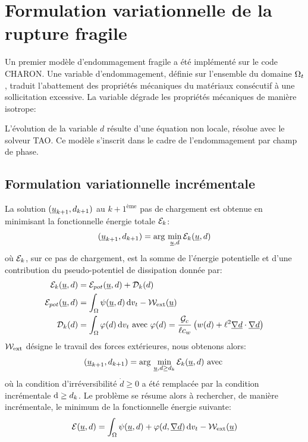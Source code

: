 \documentclass[10pt]{book}
\newcommand{\Gc}{\Gg_{c}}
\begin{document}
\section{Formulation variationnelle de la rupture fragile}\label{Section:Ajout de l'endommagement fragile}
Un premier modèle d'endommagement fragile a été implémenté sur le code CHARON. Une variable d'endommagement, définie sur l'ensemble du domaine $\Omega_{t}$, traduit l'abattement des propriétés mécaniques du matériaux consécutif à une sollicitation excessive. La variable dégrade les propriétés mécaniques de manière isotrope:

L'évolution de la variable $d$ résulte d'une équation non locale, résolue avec le solveur TAO. Ce modèle s'inscrit dans le cadre de l'endommagement par champ de phase.
\subsection{Formulation variationnelle incrémentale}
La solution $(\underline{u}_{k+1},d_{k+1})$ au $k+1^{\text{ème}}$ pas de chargement est obtenue en minimisant la fonctionnelle énergie totale $\mathcal{E}_{k}$:
\begin{equation}
(\underline{u}_{k+1},d_{k+1}) = \mathrm{arg}\,\min_{\underline{u},d} \mathcal{E}_{k}(\underline{u},d)
\label{eq:Minimisation_intra}
\end{equation}
où $\mathcal{E}_{k}$, sur ce pas de chargement, est la somme de l'énergie potentielle et d'une contribution du pseudo-potentiel de dissipation donnée par:
\begin{align}
\Etot_{k}(\Dep,d) &= \EPot(\Dep,d)+\mathcal{D}_{k}(d)\\
\EPot(\Dep,d) &=\int_{\Omega} \eHelm(\Dep,d)\dvt-\Wext(\Dep)\\
\mathcal{D}_{k}(d) &= \int_{\Omega}\varphi(d)\dvt
\avec \varphi(d)=\dfrac{\Gc}{\ell c_{w}}\left(w(d)+\ell^{2}\vec{\nabla d}\cdot\vec{\nabla d}\right)
\end{align}
$\mathcal{W}_\mathrm{ext}$ désigne le travail des forces extérieures, nous obtenons alors:
\begin{equation}
(\underline{u}_{k+1},d_{k+1})= \mathrm{arg}\,\min_{\underline{u},d \geq d_{k}} \mathcal{E}_{k}(\underline{u},d) \text{ avec } 
\label{eq:incremental-energy-minimization}
\end{equation}
où la condition d'irréversibilité $\dot{d}\geq 0$ a été remplacée par la condition incrémentale $\mathrm{d} \geq d_{k}$. Le problème se résume alors à rechercher, de manière incrémentale, le minimum de la fonctionnelle énergie suivante:
\begin{equation}
\mathcal{E}(\underline{u},d)=\int_{\Omega}\psi(\underline{u},d)+\varphi(d,\underline{\nabla d}) \,\mathrm{d}v_{t} -\mathcal{W}_\mathrm{ext}(\underline{u})
\label{eq:fonctionnelle_energie_intra}
\end{equation}
\end{document}
